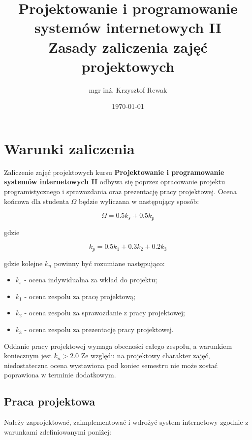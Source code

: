 \documentclass{article}
\title{
	Projektowanie i programowanie systemów internetowych II\\
	\Huge{Zasady zaliczenia zajęć projektowych}
}
\author{mgr inż. Krzysztof Rewak}
\date{\today}
\begin{document}
	\maketitle

	\section{Warunki zaliczenia}
	Zaliczenie zajęć projektowych kursu \textbf{Projektowanie i programowanie systemów internetowych II} odbywa się poprzez opracowanie projektu programistycznego i sprawozdania oraz prezentację pracy projektowej. Ocena końcowa dla studenta $\Omega$ będzie wyliczana w następujący sposób:
	
	\begin{equation} \label{eq:koncowa}
		\Omega = 0.5k_s + 0.5k_p
	\end{equation}
	
	gdzie
	
	\begin{equation} \label{eq:koncowa}
	 k_p = 0.5k_1 + 0.3k_2 + 0.2k_3
	\end{equation}
	
	gdzie kolejne $k_n$ powinny być rozumiane następująco:
	
	\begin{itemize}
		\item $k_s$ - ocena indywidualna za wkład do projektu;
		\item $k_1$ - ocena zespołu za pracę projektową;
		\item $k_2$ - ocena zespołu za sprawozdanie z pracy projektowej;
		\item $k_3$ - ocena zespołu za prezentację pracy projektowej.
	\end{itemize}
	
	Oddanie pracy projektowej wymaga obecności całego zespołu, a warunkiem koniecznym jest $k_n > 2.0$  Ze względu na projektowy charakter zajęć, niedostateczna ocena wystawiona pod koniec semestru nie może zostać poprawiona w terminie dodatkowym.
	
	\subsection{Praca projektowa}
	Należy zaprojektować, zaimplementować i wdrożyć system internetowy zgodnie z warunkami zdefiniowanymi poniżej:
	
\end{document}

